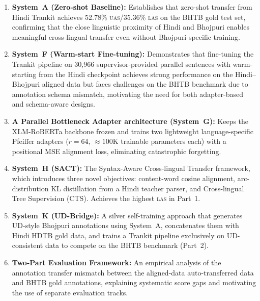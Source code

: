 \documentclass[12pt,a4paper,oneside]{report}
\newcommand{\xlmr}{XLM-RoBERTa}
\newcommand{\uas}{\textsc{uas}}
\newcommand{\las}{\textsc{las}}
\begin{document}
\begin{enumerate}
  \item \textbf{System~A (Zero-shot Baseline):} Establishes that zero-shot transfer
        from Hindi Trankit achieves 52.78\% \uas{}/35.36\% \las{} on the BHTB gold
        test set, confirming that the close linguistic proximity of Hindi and Bhojpuri
        enables meaningful cross-lingual transfer even without Bhojpuri-specific
        training.

  \item \textbf{System~F (Warm-start Fine-tuning):} Demonstrates that fine-tuning
        the Trankit pipeline on 30,966 supervisor-provided parallel sentences
        with warm-starting from the Hindi checkpoint achieves strong performance on
        the Hindi--Bhojpuri aligned data but faces challenges on the BHTB benchmark due to
        annotation schema mismatch, motivating the need for both adapter-based and
        schema-aware designs.

  \item \textbf{A Parallel Bottleneck Adapter architecture (System~G):} Keeps the
        \xlmr{} backbone frozen and trains two lightweight language-specific Pfeiffer
        adapters ($r=64$, ${\approx}100$K trainable parameters each) with a positional
        MSE alignment loss, eliminating catastrophic forgetting.

  \item \textbf{System~H (SACT):} The Syntax-Aware Cross-lingual Transfer framework,
        which introduces three novel objectives: content-word cosine alignment,
        arc-distribution KL distillation from a Hindi teacher parser, and
        Cross-lingual Tree Supervision (CTS). Achieves the highest \las{} in
        Part~1.

  \item \textbf{System~K (UD-Bridge):} A silver self-training approach that generates
        UD-style Bhojpuri annotations using System~A, concatenates them with Hindi
        HDTB gold data, and trains a Trankit pipeline exclusively on UD-consistent
        data to compete on the BHTB benchmark (Part~2).

  \item \textbf{Two-Part Evaluation Framework:} An empirical analysis of the
        annotation transfer mismatch between the aligned-data auto-transferred data
        and BHTB gold annotations, explaining systematic score gaps and motivating
        the use of separate evaluation tracks.
\end{enumerate}
\end{document}
